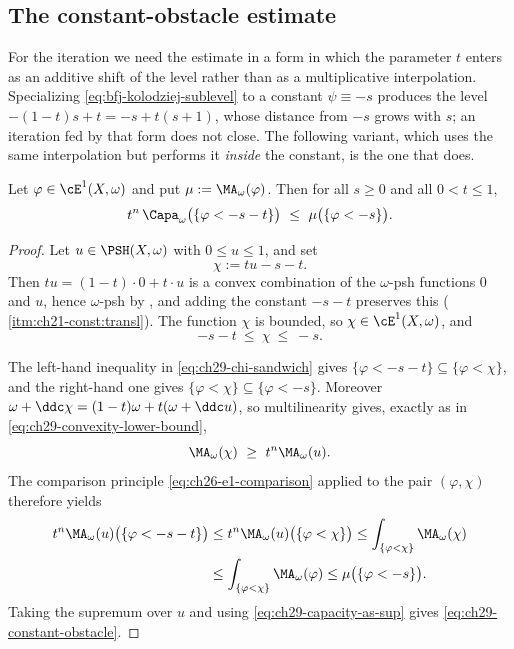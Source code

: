 \subsection{The constant-obstacle estimate}
\label{sec:ch29-constant-obstacle}

For the iteration we need the estimate in a form in which the parameter
\(t\) enters as an additive shift of the level rather than as a
multiplicative interpolation.  Specializing
\eqref{eq:bfj-kolodziej-sublevel} to a constant \(\psi\equiv-s\) produces
the level \(-(1-t)s+t=-s+t(s+1)\), whose distance from \(-s\) grows with
\(s\); an iteration fed by that form does not close.  The following
variant, which uses the same interpolation but performs it \emph{inside} the
constant, is the one that does.

\begin{proposition}
\label{prop:ch29-constant-obstacle}
Let \(\varphi\in\cE^1(X,\omega)\) and put \(\mu:=\MA_\omega(\varphi)\).
Then for all \(s\geq0\) and all \(0<t\leq1\),
\begin{equation}
\label{eq:ch29-constant-obstacle}
 t^n\,\Capa_\omega\bigl(\{\varphi<-s-t\}\bigr)
 \ \leq\ \mu\bigl(\{\varphi<-s\}\bigr).
\end{equation}
\end{proposition}

\begin{proof}
Let \(u\in\PSH(X,\omega)\) with \(0\leq u\leq1\), and set
\[
 \chi:=tu-s-t .
\]
Then \(tu=(1-t)\cdot0+t\cdot u\) is a convex combination of the
\(\omega\)-psh functions \(0\) and \(u\), hence \(\omega\)-psh by
, and adding the constant \(-s-t\) preserves this
(\,\cref{itm:ch21-const:transl}).  The function
\(\chi\) is bounded, so \(\chi\in\cE^1(X,\omega)\), and
\begin{equation}
\label{eq:ch29-chi-sandwich}
 -s-t\ \leq\ \chi\ \leq\ -s .
\end{equation}

The left-hand inequality in \eqref{eq:ch29-chi-sandwich} gives
\(\{\varphi<-s-t\}\subseteq\{\varphi<\chi\}\), and the right-hand one gives
\(\{\varphi<\chi\}\subseteq\{\varphi<-s\}\).  Moreover
\(\omega+\ddc\chi=(1-t)\omega+t(\omega+\ddc u)\), so multilinearity gives,
exactly as in \eqref{eq:ch29-convexity-lower-bound},
\[
 \MA_\omega(\chi)\ \geq\ t^n\MA_\omega(u).
\]
The comparison principle \eqref{eq:ch26-e1-comparison} applied to the pair
\((\varphi,\chi)\) therefore yields
\[
\begin{aligned}
 t^n\MA_\omega(u)\bigl(\{\varphi<-s-t\}\bigr)
 &\leq t^n\MA_\omega(u)\bigl(\{\varphi<\chi\}\bigr)
  \leq\int_{\{\varphi<\chi\}}\MA_\omega(\chi)\\
 &\leq\int_{\{\varphi<\chi\}}\MA_\omega(\varphi)
  \leq\mu\bigl(\{\varphi<-s\}\bigr).
\end{aligned}
\]
Taking the supremum over \(u\) and using \eqref{eq:ch29-capacity-as-sup}
gives \eqref{eq:ch29-constant-obstacle}.
\end{proof}

